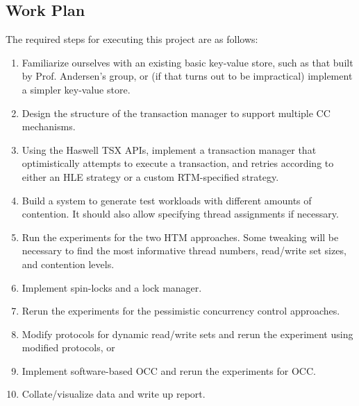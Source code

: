 \subsection{Work Plan}
The required steps for executing this project are as follows:
\begin{enumerate}
\item Familiarize ourselves with an existing basic key-value store, such
    as that built by Prof. Andersen's group, or (if that turns out to be
    impractical) implement a simpler key-value store. 
 
\item Design the structure of the transaction manager to support multiple CC mechanisms.
\item Using the Haswell TSX APIs, implement a transaction manager that optimistically attempts to execute a transaction, and retries according to either an HLE strategy or a custom RTM-specified strategy.
\item Build a system to generate test workloads with different amounts of contention. It should also allow specifying thread assignments if necessary.
\item Run the experiments for the two HTM approaches. Some tweaking will be necessary to find the most informative thread numbers, read/write set sizes, and contention levels.
\item Implement spin-locks and a lock manager.
\item Rerun the experiments for the pessimistic concurrency control approaches.
\item Modify protocols for dynamic read/write sets and rerun the experiment
    using modified protocols, or
\item Implement software-based OCC and rerun the experiments for OCC.
\item Collate/visualize data and write up report.
\end{enumerate}

